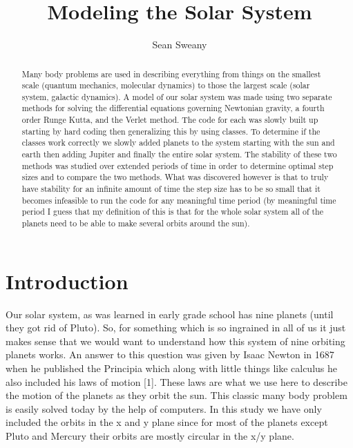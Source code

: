 \documentclass[12pt,righttag]{article}
\begin{document}
	\title{Modeling the Solar System}
	\author{Sean Sweany}
	\renewcommand{\today}{April 5, 2016}
	\maketitle
	
	\begin{abstract}
Many body problems are used in describing everything from things on the smallest scale (quantum mechanics, molecular dynamics) to those the largest scale (solar system, galactic dynamics). A model of our solar system was made using two separate methods for solving the differential equations governing Newtonian gravity, a fourth order Runge Kutta, and the Verlet method. The code for each was slowly built up starting by hard coding then generalizing this by using classes. To determine if the classes work correctly we slowly added planets to the system starting with the sun and earth then adding Jupiter and finally the entire solar system. The stability of these two methods was studied over extended periods of time in order to determine optimal step sizes and to compare the two methods. What was discovered however is that to truly have stability for an infinite amount of time the step size has to be so small that it becomes infeasible to run the code for any meaningful time period (by meaningful time period I guess that my definition of this is that for the whole solar system all of the planets need to be able to make several orbits around the sun).
	\end{abstract}

	
	\section{Introduction}
    Our solar system, as was learned in early grade school has nine planets (until they got rid of Pluto). So, for something which is so ingrained in all of us it just makes sense that we would want to understand how this system of nine orbiting planets works. An answer to this question was given by Isaac Newton in 1687 when he published the Principia which along with little things like calculus he also included his laws of motion [1]. These laws are what we use here to describe the motion of the planets as they orbit the sun. This classic many body problem is easily solved today by the help of computers. In this study we have only included the orbits in the x and y plane since for most of the planets except Pluto and Mercury their orbits are mostly circular in the x/y plane.
\end{document}
